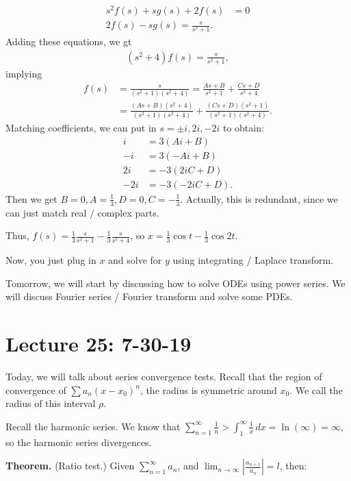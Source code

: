 \documentclass{article}
\begin{document}
\begin{align*}
  s^2 f(s) + s g(s) + 2 f(s) &= 0 \\
  2 f(s) - s g(s) = \frac{s}{s^2 + 1}.
\end{align*}
Adding these equations, we gt
\begin{align*}
  (s^2 + 4) f(s) = \frac{s}{s^2+1},
\end{align*}
implying
\begin{align*}
  f(s) &= \frac{s}{(s^2+1)(s^2+4)} = \frac{As + B}{s^2 + 1} + \frac{Cs + D}{s^2 + 4} \\
  &= \frac{(As+B)(s^2+4)}{(s^2+1)(s^2+4)} + \frac{(Cs + D)(s^2+1)}{(s^2+1)(s^2+4)}.
\end{align*}
Matching coefficients, we can put in $s = \pm i, 2i, -2i$ to obtain:
\begin{align*}
  i &= 3(Ai + B) \\ 
  -i &= 3(-A i + B) \\
  2i &= -3(2iC + D) \\
  -2i &= -3 (-2iC + D).
\end{align*}
Then we get $B = 0, A = \frac{1}{3}, D = 0, C = -\frac{1}{3}$.  Actually, this is redundant, since we can just match real / complex parts.

Thus, $f(s) = \frac{1}{3} \frac{s}{s^2+1} - \frac{1}{3} \frac{s}{s^2+4}$, so $x =  \frac{1}{3} \cos t - \frac{1}{3} \cos 2t$.

Now, you just plug in $x$ and solve for $y$ using integrating / Laplace transform.

Tomorrow, we will start by discussing how to solve ODEs using power series.  We will discuss Fourier series / Fourier transform and solve some PDEs.

\section{Lecture 25: 7-30-19}

Today, we will talk about series convergence tests.  Recall that the region of convergence of $\sum a_n (x - x_0)^n$, the radius is symmetric around $x_0$.  We call the radius of this interval $\rho$.

Recall the harmonic series.  We know that $\sum_{n=1}^{\infty} \frac{1}{n} > \int_{1}^{\infty} \frac{1}{x} \, dx = \ln (\infty) = \infty$, so the harmonic series divergences.

{\bf Theorem.} (Ratio test.)  Given $\sum_{n=1}^{\infty} a_n$, and $\lim_{n \to \infty} | \frac{a_{n+1}}{a_n} | = l$, then:
\end{document}

